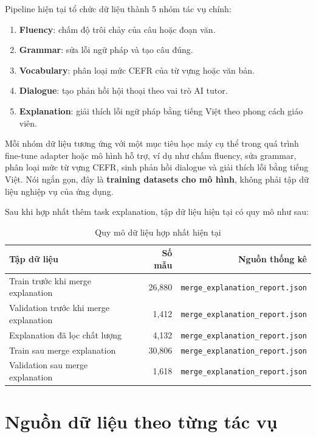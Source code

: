 \documentclass[12pt,a4paper]{article}
\begin{document}
Pipeline hiện tại tổ chức dữ liệu thành 5 nhóm tác vụ chính:

\begin{enumerate}[leftmargin=1.2cm]
    \item \textbf{Fluency}: chấm độ trôi chảy của câu hoặc đoạn văn.
    \item \textbf{Grammar}: sửa lỗi ngữ pháp và tạo câu đúng.
    \item \textbf{Vocabulary}: phân loại mức CEFR của từ vựng hoặc văn bản.
    \item \textbf{Dialogue}: tạo phản hồi hội thoại theo vai trò AI tutor.
    \item \textbf{Explanation}: giải thích lỗi ngữ pháp bằng tiếng Việt theo phong cách giáo viên.
\end{enumerate}

Mỗi nhóm dữ liệu tương ứng với một mục tiêu học máy cụ thể trong quá trình fine-tune adapter hoặc mô hình hỗ trợ, ví dụ như chấm fluency, sửa grammar, phân loại mức từ vựng CEFR, sinh phản hồi dialogue và giải thích lỗi bằng tiếng Việt. Nói ngắn gọn, đây là \textbf{training datasets cho mô hình}, không phải tập dữ liệu nghiệp vụ của ứng dụng.

Sau khi hợp nhất thêm task explanation, tập dữ liệu hiện tại có quy mô như sau:

\begin{table}[h]
\centering
\begin{tabular}{lrr}
\toprule
\textbf{Tập dữ liệu} & \textbf{Số mẫu} & \textbf{Nguồn thống kê} \\
\midrule
Train trước khi merge explanation & 26,880 & \texttt{merge\_explanation\_report.json} \\
Validation trước khi merge explanation & 1,412 & \texttt{merge\_explanation\_report.json} \\
Explanation đã lọc chất lượng & 4,132 & \texttt{merge\_explanation\_report.json} \\
Train sau merge explanation & 30,806 & \texttt{merge\_explanation\_report.json} \\
Validation sau merge explanation & 1,618 & \texttt{merge\_explanation\_report.json} \\
\bottomrule
\end{tabular}
\caption{Quy mô dữ liệu hợp nhất hiện tại}
\end{table}

\section{Nguồn dữ liệu theo từng tác vụ}
\end{document}
